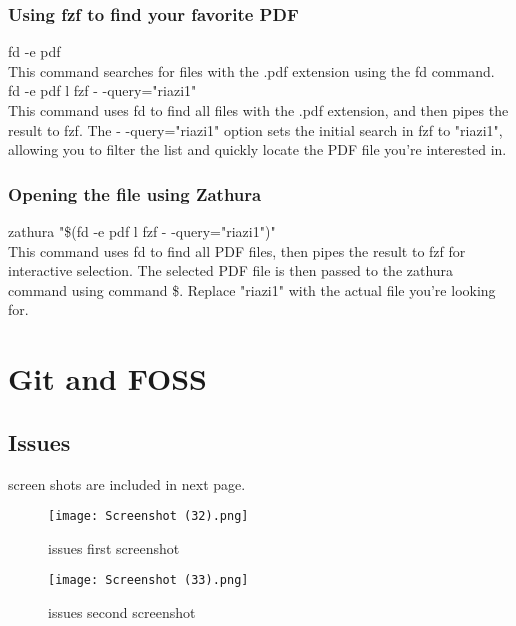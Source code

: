 \documentclass{article}
\begin{document}
\subsubsection{Using fzf to find your favorite PDF}
fd -e pdf\\
This command searches for files with the .pdf extension using the fd command.\\
fd -e pdf l fzf - -query="riazi1"\\
This command uses fd to find all files with the .pdf extension, and then pipes the result to fzf. The - -query="riazi1" option sets the initial search in fzf to "riazi1", allowing you to filter the list and quickly locate the PDF file you're interested in.
\subsubsection{Opening the file using Zathura}
zathura "\$(fd -e pdf l fzf - -query="riazi1")"\\
This command uses fd to find all PDF files, then pipes the result to fzf for interactive selection. The selected PDF file is then passed to the zathura command using command \$. Replace "riazi1" with the actual file you're looking for.
\section{Git and FOSS}
\subsection{Issues}
screen shots are included in next page.
\newpage
{}
\begin{figure}
\begin{center}
    

    \texttt{[image: Screenshot (32).png]}
    \caption{issues first screenshot}
    \texttt{[image: Screenshot (33).png]}
    \caption{issues second screenshot}
    \end{center}
\end{figure}
\end{document}
